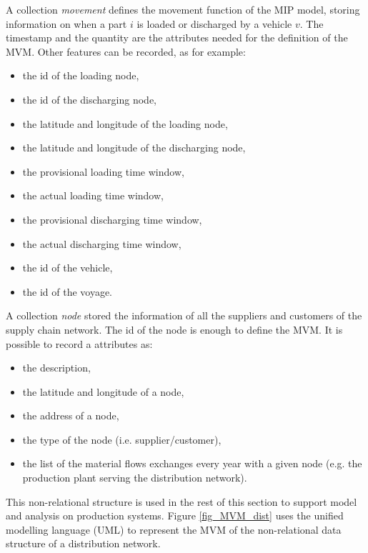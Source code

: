 A collection \textit{movement} defines the movement function of the MIP model, storing information on when a part $i$ is loaded or discharged by a vehicle $v$. The timestamp and the quantity are the attributes needed for the definition of the MVM. Other features can be recorded, as for example:

\begin{itemize}
    \item the id of the loading node, 
    \item the id of the discharging node,
    \item the latitude and longitude of the loading node,
    \item the latitude and longitude of the discharging node,
    \item the provisional loading time window,
    \item the actual loading time window,
    \item the provisional discharging time window,
    \item the actual discharging time window,
    \item the id of the vehicle,
    \item the id of the voyage.
\end{itemize}

A collection \textit{node} stored the information of all the suppliers and customers of the supply chain network. The id of the node is enough to define the MVM. It is possible to record a attributes as:

\begin{itemize}
    \item the description,
    \item the latitude and longitude of a node,
    \item the address of a node, 
    \item the type of the node (i.e. supplier/customer),
    \item the list of the material flows exchanges every year with a given node (e.g. the production plant serving the distribution network).
\end{itemize}

This non-relational structure is used in the rest of this section to support model and analysis on production systems. Figure \ref{fig_MVM_dist} uses the unified modelling language (UML) to represent the MVM of the non-relational data structure of a distribution network.

